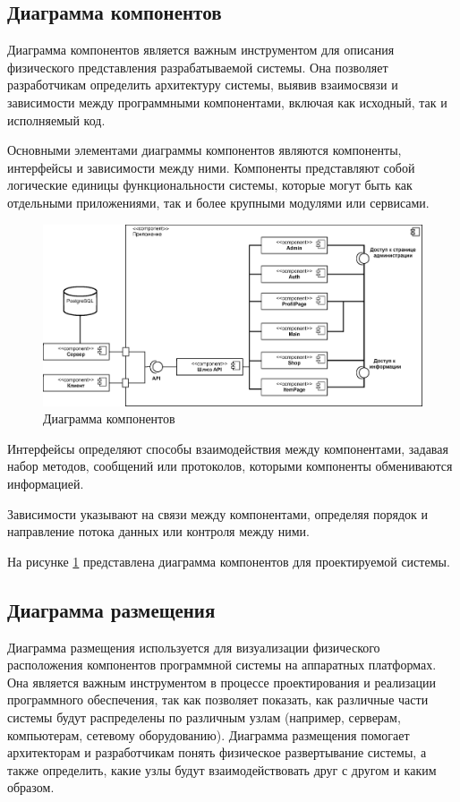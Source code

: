 \subsection{Диаграмма компонентов}

Диаграмма компонентов является важным инструментом для описания физического представления разрабатываемой системы. Она позволяет разработчикам определить архитектуру системы, выявив взаимосвязи и зависимости между программными компонентами, включая как исходный, так и исполняемый код.

Основными элементами диаграммы компонентов являются компоненты, интерфейсы и зависимости между ними. Компоненты представляют собой логические единицы функциональности системы, которые могут быть как отдельными приложениями, так и более крупными модулями или сервисами.

\begin{figure}[h]
	\includegraphics[width=1\linewidth]{images/diagcomp}
	\caption{Диаграмма компонентов}
	\label{fig:diagcomp}
\end{figure}

Интерфейсы определяют способы взаимодействия между компонентами, задавая набор методов, сообщений или протоколов, которыми компоненты обмениваются информацией.

Зависимости указывают на связи между компонентами, определяя порядок и направление потока данных или контроля между ними.

На рисунке \ref{fig:diagcomp} представлена диаграмма компонентов для проектируемой системы.

\subsection{Диаграмма размещения}

Диаграмма размещения используется для визуализации физического расположения компонентов программной системы на аппаратных платформах. Она является важным инструментом в процессе проектирования и реализации программного обеспечения, так как позволяет показать, как различные части системы будут распределены по различным узлам (например, серверам, компьютерам, сетевому оборудованию). Диаграмма размещения помогает архитекторам и разработчикам понять физическое развертывание системы, а также определить, какие узлы будут взаимодействовать друг с другом и каким образом.

